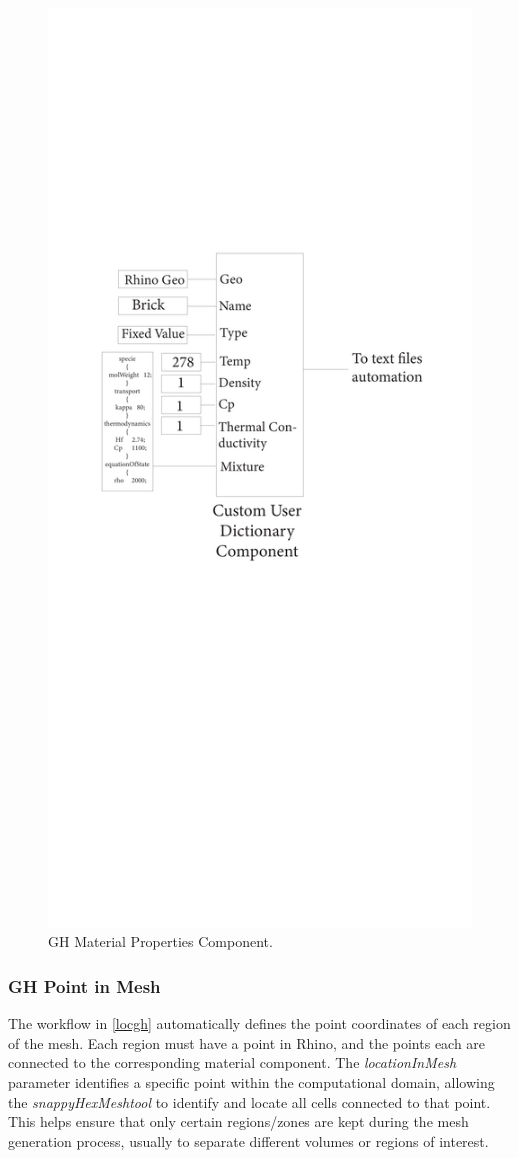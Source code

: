 \begin{figure}[tbh]
\centering
\includegraphics[trim=5cm 32cm 4.5cm 7cm, clip, width=0.55\linewidth]{Figures/THESISGH2.pdf}
\hspace{0.7cm}
\caption{\gls{GH} Material Properties Component.}
\label{matgh}
\end{figure}





\subsubsection{\gls{GH} Point in Mesh}
The workflow in \ref{locgh} automatically defines the point coordinates of each region of the mesh. Each region must have a point in Rhino, and the points each are connected to the corresponding material component. The \textit{locationInMesh} parameter identifies a specific point within the computational domain, allowing the \textit{snappyHexMeshtool} to identify and locate all cells connected to that point. This helps ensure that only certain regions/zones are kept during the mesh generation process, usually to separate different volumes or regions of interest.


